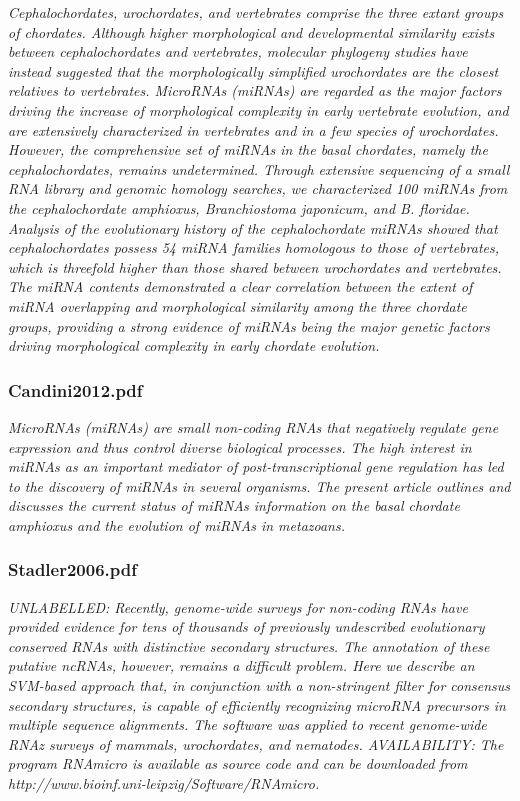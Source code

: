 \cite{Dai2009}
\textit{Cephalochordates, urochordates, and vertebrates comprise the three extant groups of chordates. Although higher morphological and developmental similarity exists between cephalochordates and vertebrates, molecular phylogeny studies have instead suggested that the morphologically simplified urochordates are the closest relatives to vertebrates. MicroRNAs (miRNAs) are regarded as the major factors driving the increase of morphological complexity in early vertebrate evolution, and are extensively characterized in vertebrates and in a few species of urochordates. However, the comprehensive set of miRNAs in the basal chordates, namely the cephalochordates, remains undetermined. Through extensive sequencing of a small RNA library and genomic homology searches, we characterized 100 miRNAs from the cephalochordate amphioxus, Branchiostoma japonicum, and B. floridae. Analysis of the evolutionary history of the cephalochordate miRNAs showed that cephalochordates possess 54 miRNA families homologous to those of vertebrates, which is threefold higher than those shared between urochordates and vertebrates. The miRNA contents demonstrated a clear correlation between the extent of miRNA overlapping and morphological similarity among the three chordate groups, providing a strong evidence of miRNAs being the major genetic factors driving morphological complexity in early chordate evolution.}
\subsubsection{Candini2012.pdf}
\cite{Candiani2012}
\textit{MicroRNAs (miRNAs) are small non-coding RNAs that negatively regulate gene expression and thus control diverse biological processes. The high interest in miRNAs as an important mediator of post-transcriptional gene regulation has led to the discovery of miRNAs in several organisms. The present article outlines and discusses the current status of miRNAs information on the basal chordate amphioxus and the evolution of miRNAs in metazoans.}

\subsubsection{Stadler2006.pdf}
\cite{Hertel2006}
\textit{UNLABELLED: Recently, genome-wide surveys for non-coding RNAs have provided evidence for tens of thousands of previously undescribed evolutionary conserved RNAs with distinctive secondary structures. The annotation of these putative ncRNAs, however, remains a difficult problem. Here we describe an SVM-based approach that, in conjunction with a non-stringent filter for consensus secondary structures, is capable of efficiently recognizing microRNA precursors in multiple sequence alignments. The software was applied to recent genome-wide RNAz surveys of mammals, urochordates, and nematodes. AVAILABILITY: The program RNAmicro is available as source code and can be downloaded from http://www.bioinf.uni-leipzig/Software/RNAmicro.}

